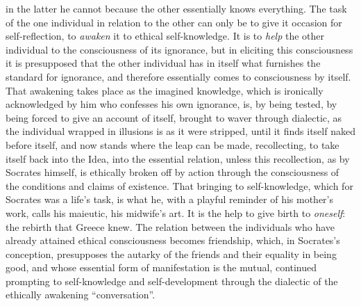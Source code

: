 in the latter he cannot because the other essentially knows everything.
The task of the one individual in relation to the other can only
be to give it occasion for self-reflection, to \emph{awaken}
it to ethical self-knowledge. It is to \emph{help} the other individual to the consciousness of its ignorance, but in eliciting this consciousness it is presupposed that the other individual
has in itself what furnishes the standard for ignorance, and
therefore essentially comes to consciousness by itself. That
awakening takes place as the imagined knowledge, which is ironically acknowledged by him who confesses his own ignorance, is, by
being tested, by being forced to give an account of itself, brought to
waver through dialectic, as the in\setcounter{footnote}{0}dividual wrapped in illusions is as it were stripped, until it finds itself naked before
itself, and now stands where the leap can be made, recollecting,
to take itself back into the Idea, into the essential relation, unless this
recollection, as by Socrates himself, is ethically broken off by action through the consciousness of the conditions and claims of existence.
That bringing to self-knowledge, which for Socrates was a life's task, is what he, with a playful reminder of his mother's work, calls his maieutic, his midwife's art. It
is the help to give birth to \emph{oneself}: the rebirth that Greece
knew. The relation between the individuals who have already attained ethical consciousness becomes friendship, which, in Socrates's conception, presupposes the autarky of the friends and their equality in being good, and whose essential form of manifestation is
the mutual, continued prompting to self-knowledge and self-development through the dialectic of the ethically awakening ``conversation''.

